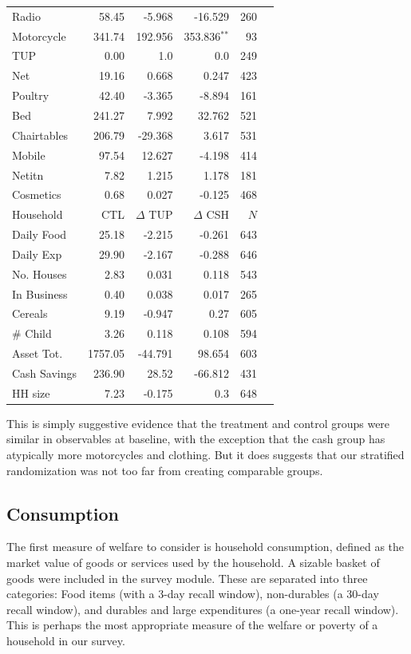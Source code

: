 \documentclass[12pt,article]{article}
\begin{document}
\begin{longtable}{lrrrrr}
Radio & 58.45 & -5.968 & -16.529 & 260\\
Motorcycle & 341.74 & 192.956 & 353.836$^{\text{**}}$ & 93\\
TUP & 0.00 & 1.0 & 0.0 & 249\\
Net & 19.16 & 0.668 & 0.247 & 423\\
Poultry & 42.40 & -3.365 & -8.894 & 161\\
Bed & 241.27 & 7.992 & 32.762 & 521\\
Chairtables & 206.79 & -29.368 & 3.617 & 531\\
Mobile & 97.54 & 12.627 & -4.198 & 414\\
Netitn & 7.82 & 1.215 & 1.178 & 181\\
Cosmetics & 0.68 & 0.027 & -0.125 & 468\\
\hline
Household & CTL & $\Delta$ TUP & $\Delta$ CSH & $N$\\
\hline
Daily Food & 25.18 & -2.215 & -0.261 & 643\\
Daily Exp & 29.90 & -2.167 & -0.288 & 646\\
No. Houses & 2.83 & 0.031 & 0.118 & 543\\
In Business & 0.40 & 0.038 & 0.017 & 265\\
Cereals & 9.19 & -0.947 & 0.27 & 605\\
\# Child & 3.26 & 0.118 & 0.108 & 594\\
Asset Tot. & 1757.05 & -44.791 & 98.654 & 603\\
Cash Savings & 236.90 & 28.52 & -66.812 & 431\\
HH size & 7.23 & -0.175 & 0.3 & 648\\
\hline
\end{longtable}

This is simply suggestive evidence that the treatment and control groups were similar
in observables at baseline, with the exception that the cash group has atypically
more motorcycles and clothing. But it does suggests that our stratified randomization
was not too far from creating comparable groups.

\subsection{Consumption}
\label{sec-3-2}

The first measure of welfare to consider is household consumption, defined as the
market value of goods or services used by the household. A sizable basket of goods
were included in the survey module. These are separated into three categories: Food
items (with a 3-day recall window), non-durables (a 30-day recall window), and
durables and large expenditures (a one-year recall window). This is perhaps the most
appropriate measure of the welfare or poverty of a household in our survey. 
\end{document}
